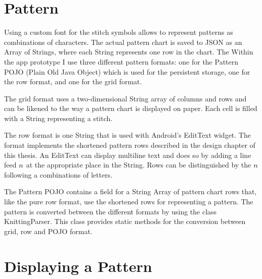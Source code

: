 \section{Pattern}
Using a custom font for the stitch symbols allows to represent patterns as combinations of characters. The actual pattern chart is saved to \gls{JSON} as an Array of Strings, where each String represents one row in the chart. The 
 Within the app prototype I use three different pattern formats: one for the Pattern POJO (Plain Old Java Object) which is used for the persistent storage, one for the row format, and one for the grid format.

The grid format uses a two-dimensional String array of columns and rows and can  be likened to the way a pattern chart is displayed on paper. Each cell is filled with a String representing a stitch.

The row format is one String that is used with Android’s EditText widget. The format implements the shortened pattern rows described in the design chapter of this thesis. An EditText can display multiline text and does so by adding a line feed $\\n$ at the appropriate place in the String. Rows can be distinguished by the $\\n$ following a combinations of letters.

The Pattern POJO contains a field for a String Array of pattern chart rows that, like the pure row format, use the shortened rows for representing a pattern.
The pattern is converted between the different formats by using the class KnittingParser. This class provides static methods for the conversion between grid, row and POJO format.

\section{Displaying a Pattern}

